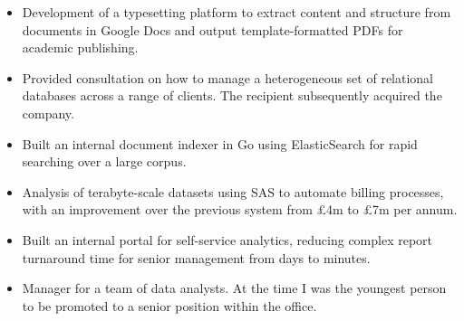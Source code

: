 \documentclass[12pt,a4paper,sans]{moderncv}
\begin{document}
\vspace{0.5em}
{
  \begin{itemize}
  \setlength\itemsep{0.5em}
  \vspace{-0.5em}
  \item
    Development of a typesetting platform to extract content and structure from documents in Google Docs and output template-formatted PDFs for academic publishing.
  \item
    Provided consultation on how to manage a heterogeneous set of relational databases across a range of clients. The recipient subsequently acquired the company.
  \item
    Built an internal document indexer in Go using ElasticSearch for rapid searching over a large corpus.
  \end{itemize}
  \vspace{0.5em}
}

\vspace{0.5em}

\vspace{0.5em}
{
  \begin{itemize}
  \setlength\itemsep{0.5em}
  \vspace{-0.5em}
  \item
    Analysis of terabyte-scale datasets using SAS to automate billing processes, with an improvement over the previous system from £4m to £7m per annum.
  \item
    Built an internal portal for self-service analytics, reducing complex report turnaround time for senior management from days to minutes.
  \item
    Manager for a team of data analysts. At the time I was the youngest person to be promoted to a senior position within the office.
  \end{itemize}
  \vspace{0.5em}
}

\vspace{0.5em}
\end{document}
